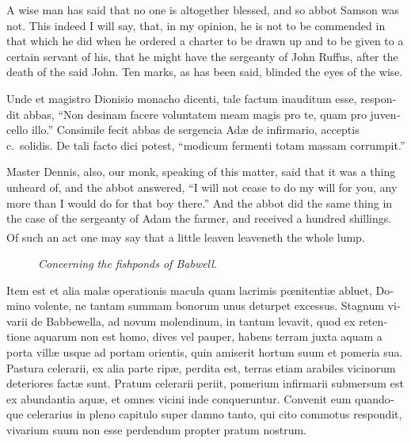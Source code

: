 \documentclass[10pt]{book}
\newcounter{engnote}
\newcommand{\engnotenum}{\textsuperscript{\arabic{engnote}\stepcounter{engnote}}}
\newcommand{\engnotetext}[1]{\vphantom{\footnotemark{}}\footnotetext{#1}}
\newcommand{\blockhead}[4][]{
\begin{figure}
\centering
\vspace{#4}
\parbox{2.75cm}{\begin{center}\footnotesize \color{BrickRed} \emph{#2}\\ #1 \end{center}}
\end{figure}
}
\begin{document}
\begin{paracol}{2}
\switchcolumn

A wise man has said that no one is altogether blessed, and so abbot Samson was not. This indeed I will say, that, in my opinion, he is not to be commended in that which he did when he ordered a charter to be drawn up and to be given to a certain servant of his, that he might have the sergeanty of John Ruffus, after the death of the said John. Ten marks, as has been said, blinded the eyes of the wise.

\switchcolumn*

\begin{otherlanguage}{latin}
Unde et magistro Dionisio monacho dicenti, tale factum inauditum esse, respondit abbas, ``Non desinam facere voluntatem meam magis pro te, quam pro juvencello illo.'' Consimile fecit abbas de sergencia Ad\ae{} de infirmario, acceptis c.\ solidis. De tali facto dici potest, ``modicum fermenti totam massam corrumpit.''\engnotetext{Gal.\ v., \oldstylenums{9}.}
\end{otherlanguage}

\switchcolumn

Master Dennis, also, our monk, speaking of this matter, said that it was a thing unheard of, and the abbot answered, ``I will not cease to do my will for you, any more than I would do for that boy there.'' And the abbot did the same thing in the case of the sergeanty of Adam the farmer, and received a hundred shillings. Of such an act one may say that a little leaven leaveneth the whole lump.\engnotenum{}

\switchcolumn*

\begin{otherlanguage}{latin}
\blockhead{Concerning the fishponds of Babwell.}{3}{-.55cm}
Item est et alia mal\ae{} operationis macula quam lacrimis p\oe{}nitenti\ae{} abluet, Domino volente, ne tantam summam bonorum unus deturpet excessus. Stagnum vivarii de Babbewella, ad novum molendinum, in tantum levavit, quod ex retentione aquarum non est homo, dives vel pauper, habens terram juxta aquam a porta vill\ae{} usque ad portam orientis, quin amiserit hortum suum et pomeria sua. Pastura celerarii, ex alia parte rip\ae{}, perdita est, terras etiam arabiles vicinorum deteriores fact\ae{} sunt. Pratum celerarii periit, pomerium infirmarii submersum est ex abundantia aqu\ae{}, et omnes vicini inde conqueruntur. Convenit eum quandoque celerarius in pleno capitulo super damno tanto, qui cito commotus respondit, vivarium suum non esse perdendum propter pratum nostrum.


\end{otherlanguage}
\end{paracol}
\end{document}
